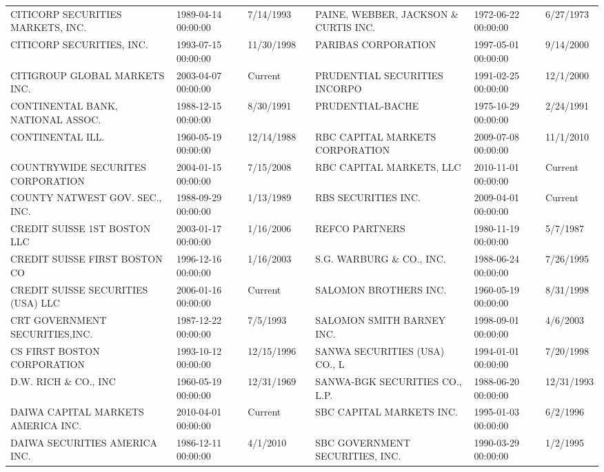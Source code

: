 \begin{tabular}{lllllll}
CITICORP SECURITIES MARKETS, INC.    & 1989-04-14 00:00:00 & 7/14/1993 &  & PAINE, WEBBER, JACKSON \& CURTIS INC. & 1972-06-22 00:00:00 & 6/27/1973 \\
CITICORP SECURITIES, INC.            & 1993-07-15 00:00:00 & 11/30/1998 &  & PARIBAS CORPORATION                  & 1997-05-01 00:00:00 & 9/14/2000 \\
CITIGROUP GLOBAL MARKETS INC.   & 2003-04-07 00:00:00 & Current &  & PRUDENTIAL SECURITIES INCORPO   & 1991-02-25 00:00:00 & 12/1/2000 \\
CONTINENTAL BANK, NATIONAL ASSOC.    & 1988-12-15 00:00:00 & 8/30/1991 &  & PRUDENTIAL-BACHE                & 1975-10-29 00:00:00 & 2/24/1991 \\
CONTINENTAL ILL.                     & 1960-05-19 00:00:00 & 12/14/1988 &  & RBC CAPITAL MARKETS CORPORATION & 2009-07-08 00:00:00 & 11/1/2010 \\
COUNTRYWIDE SECURITES CORPORATION & 2004-01-15 00:00:00 & 7/15/2008 &  & RBC CAPITAL MARKETS, LLC & 2010-11-01 00:00:00 & Current \\
COUNTY NATWEST GOV. SEC., INC.       & 1988-09-29 00:00:00 & 1/13/1989 &  & RBS SECURITIES INC. & 2009-04-01 00:00:00 & Current \\
CREDIT SUISSE 1ST BOSTON LLC    & 2003-01-17 00:00:00 & 1/16/2006 &  & REFCO PARTNERS                      & 1980-11-19 00:00:00 & 5/7/1987 \\
CREDIT SUISSE FIRST BOSTON CO       & 1996-12-16 00:00:00 & 1/16/2003 &  & S.G. WARBURG \& CO., INC.             & 1988-06-24 00:00:00 & 7/26/1995 \\
CREDIT SUISSE SECURITIES (USA) LLC & 2006-01-16 00:00:00 & Current &  & SALOMON BROTHERS INC.               & 1960-05-19 00:00:00 & 8/31/1998 \\
CRT GOVERNMENT SECURITIES,INC.      & 1987-12-22 00:00:00 & 7/5/1993 &  & SALOMON SMITH BARNEY INC.       & 1998-09-01 00:00:00 & 4/6/2003 \\
CS FIRST BOSTON CORPORATION         & 1993-10-12 00:00:00 & 12/15/1996 &  & SANWA SECURITIES (USA) CO., L       & 1994-01-01 00:00:00 & 7/20/1998 \\
D.W. RICH \& CO., INC                 & 1960-05-19 00:00:00 & 12/31/1969 &  & SANWA-BGK SECURITIES CO., L.P.      & 1988-06-20 00:00:00 & 12/31/1993 \\
DAIWA CAPITAL MARKETS AMERICA INC. & 2010-04-01 00:00:00 & Current &  & SBC CAPITAL MARKETS INC.        & 1995-01-03 00:00:00 & 6/2/1996 \\
DAIWA SECURITIES AMERICA INC.       & 1986-12-11 00:00:00 & 4/1/2010 &  & SBC GOVERNMENT SECURITIES, INC. & 1990-03-29 00:00:00 & 1/2/1995 \\

\end{tabular}
